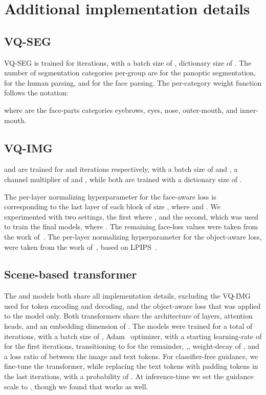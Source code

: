 \documentclass[final]{cvpr}
\begin{document}
\section{Additional implementation details}

\subsection{VQ-SEG}
VQ-SEG is trained for  iterations, with a batch size of , dictionary size of . The number of segmentation categories per-group are  for the panoptic segmentation,  for the human parsing, and  for the face parsing. The per-category weight function follows the notation:


where  are the face-parts categories eyebrows, eyes, nose, outer-mouth, and inner-mouth.


\subsection{VQ-IMG}
 and  are trained for  and  iterations respectively, with a batch size of  and , a channel multiplier of  and , while both are trained with a dictionary size of . 

The per-layer normalizing hyperparameter for the face-aware loss is  corresponding to the last layer of each block of size , where  and . We experimented with two settings, the first where , and the second, which was used to train the final models, where . The remaining face-loss values were taken from the work of~\cite{gafni2019live}.
The per-layer normalizing hyperparameter for the object-aware loss,  were taken from the work of~\cite{esser2021taming}, based on LPIPS~\cite{zhang2018unreasonable}.

\subsection{Scene-based transformer}
The  and  models both share all implementation details, excluding the VQ-IMG used for token encoding and decoding, and the object-aware loss that was applied to the  model only. Both transformers share the architecture of  layers,  attention heads, and an embedding dimension of . The models were trained for a total of  iterations, with a batch size of , Adam~\cite{kingma2014adam} optimizer, with a starting learning-rate of  for the first  iterations, transitioning to  for the remainder, ,, weight-decay of , and a loss ratio of  between the image and text tokens.
For classifier-free guidance, we fine-tune the transformer, while replacing the text tokens with padding tokens in the last  iterations, with a probability of . At inference-time we set the guidance scale to , though we found that  works as well.
\end{document}
